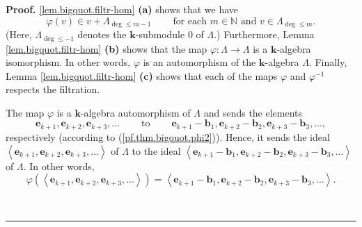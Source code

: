 \documentclass[numbers=enddot,12pt,final,onecolumn,notitlepage]{scrartcl}%
\theoremstyle{definition}
\newenvironment{proof}[1][Proof]{\noindent\textbf{#1.} }{\ \rule{0.5em}{0.5em}}
\begin{document}
\begin{proof}
\ref{lem.bigquot.filtr-hom} \textbf{(a)} shows that we have%
\begin{equation}
\varphi\left(  v\right)  \in v+\Lambda_{\deg\leq m-1}%
\ \ \ \ \ \ \ \ \ \ \text{for each }m\in\mathbb{N}\text{ and }v\in
\Lambda_{\deg\leq m}. \label{pf.thm.bigquot.phiv}%
\end{equation}
(Here, $\Lambda_{\deg\leq-1}$ denotes the $\mathbf{k}$-submodule $0$ of
$\Lambda$.) Furthermore, Lemma \ref{lem.bigquot.filtr-hom} \textbf{(b)} shows
that the map $\varphi:\Lambda\rightarrow\Lambda$ is a $\mathbf{k}$-algebra
isomorphism. In other words, $\varphi$ is an automorphism of the $\mathbf{k}%
$-algebra $\Lambda$. Finally, Lemma \ref{lem.bigquot.filtr-hom} \textbf{(c)}
shows that each of the maps $\varphi$ and $\varphi^{-1}$ respects the filtration.

The map $\varphi$ is a $\mathbf{k}$-algebra automorphism of $\Lambda$ and
sends the elements
\[
\mathbf{e}_{k+1},\mathbf{e}_{k+2},\mathbf{e}_{k+3},\ldots
\ \ \ \ \ \ \ \ \ \ \text{to}\ \ \ \ \ \ \ \ \ \ \mathbf{e}_{k+1}%
-\mathbf{b}_{1},\mathbf{e}_{k+2}-\mathbf{b}_{2},\mathbf{e}_{k+3}%
-\mathbf{b}_{3},\ldots,
\]
respectively (according to (\ref{pf.thm.bigquot.phi2})). Hence, it sends the
ideal $\left\langle \mathbf{e}_{k+1},\mathbf{e}_{k+2},\mathbf{e}_{k+3}%
,\ldots\right\rangle $ of $\Lambda$ to the ideal $\left\langle \mathbf{e}%
_{k+1}-\mathbf{b}_{1},\mathbf{e}_{k+2}-\mathbf{b}_{2},\mathbf{e}%
_{k+3}-\mathbf{b}_{3},\ldots\right\rangle $ of $\Lambda$. In other words,%
\begin{equation}
\varphi\left(  \left\langle \mathbf{e}_{k+1},\mathbf{e}_{k+2},\mathbf{e}%
_{k+3},\ldots\right\rangle \right)  =\left\langle \mathbf{e}_{k+1}%
-\mathbf{b}_{1},\mathbf{e}_{k+2}-\mathbf{b}_{2},\mathbf{e}_{k+3}%
-\mathbf{b}_{3},\ldots\right\rangle . \label{pf.thm.bigquot.phiideal2}%
\end{equation}



\end{proof}
\end{document}
